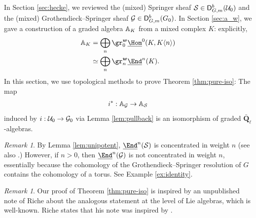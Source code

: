 \documentclass[a4paper,10pt,leqno]{amsart}
\theoremstyle{plain}
\theoremstyle{plain}
\theoremstyle{plain}
\theoremstyle{definition}
\theoremstyle{remark}
\newtheorem{rem}[thm]{Remark}
\newcommand{\QL}{\bar{\mathbf{Q}}_\ell}
\begin{document}
\subsection{}

In Section \ref{sec:hecke}, we reviewed the (mixed) Springer sheaf $\cal{S} \in \sf{D}_{G, m}^b(\cal{U}_0)$ and the (mixed) Grothendieck--Springer sheaf $\cal{G} \in \sf{D}_{G, m}^b(G_0)$.
In Section \ref{sec:a_w}, we gave a construction of a graded algebra $\bb{A}_K$ from a mixed complex $K$: explicitly,
\begin{align}\begin{split}
\bb{A}_K 
&= \bigoplus_n
{\gr_0^{\bm{w}}}
\SHom^0(K, K\langle n\rangle)\\
&\simeq \bigoplus_n
{\gr_n^{\bm{w}}}
\SEnd^n(K).
\end{split}\end{align}
In this section, we use topological methods to prove Theorem \ref{thm:pure-iso}:
The map 
\begin{align}
i^\ast : \bb{A}_\cal{G} \to \bb{A}_\cal{S}
\end{align}
induced by $i : \cal{U}_0 \to \cal{G}_0$ via Lemma \ref{lem:pullback} is an isomorphism of graded $\QL$-algebras.

\begin{rem}\label{rem:impure}
By Lemma \ref{lem:unipotent}, $\SEnd^n(\cal{S})$ is concentrated in weight $n$ (see also \cite[Lem.\ 5.4]{rider}.)
However, if $n > 0$, then $\SEnd^n(\cal{G})$ is not concentrated in weight $n$, essentially because the cohomology of the Grothendieck--Springer resolution of $G$ contains the cohomology of a torus.
See Example \ref{ex:identity}.
\end{rem}

\begin{rem}
Our proof of Theorem \ref{thm:pure-iso} is inspired by an unpublished note of Riche about the analogous statement at the level of Lie algebras, which is well-known.
Riche states that his note was inspired by \cite[\S{3.4}]{cg}.
\end{rem}

\subsection{}
\end{document}
